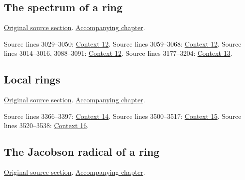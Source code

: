 \subsection{The spectrum of a ring}
\hypertarget{algebra-source-section-spectrum-ring}{}
\noindent\href{https://github.com/stacks/stacks-project/blob/a04446e57ec1fbc252a871afcec7752fb2807b14/algebra.tex\#L2964}{Original source section}. \href{algebra.pdf\#nameddest=section-spectrum-ring}{Accompanying chapter}.

\begin{AlgebraSourceRoutes}
 Source lines 3029--3050: \hyperlink{algebra-context-012}{Context 12}.
 Source lines 3059--3068: \hyperlink{algebra-context-012}{Context 12}.
 Source lines 3014--3016, 3088--3091: \hyperlink{algebra-context-012}{Context 12}.
 Source lines 3177--3204: \hyperlink{algebra-context-013}{Context 13}.
\end{AlgebraSourceRoutes}

\subsection{Local rings}
\hypertarget{algebra-source-section-local-rings}{}
\noindent\href{https://github.com/stacks/stacks-project/blob/a04446e57ec1fbc252a871afcec7752fb2807b14/algebra.tex\#L3305}{Original source section}. \href{algebra.pdf\#nameddest=section-local-rings}{Accompanying chapter}.

\begin{AlgebraSourceRoutes}
 Source lines 3366--3397: \hyperlink{algebra-context-014}{Context 14}.
 Source lines 3500--3517: \hyperlink{algebra-context-015}{Context 15}.
 Source lines 3520--3538: \hyperlink{algebra-context-016}{Context 16}.
\end{AlgebraSourceRoutes}

\subsection{The Jacobson radical of a ring}
\hypertarget{algebra-source-section-radical}{}
\noindent\href{https://github.com/stacks/stacks-project/blob/a04446e57ec1fbc252a871afcec7752fb2807b14/algebra.tex\#L3546}{Original source section}. \href{algebra.pdf\#nameddest=section-radical}{Accompanying chapter}.

